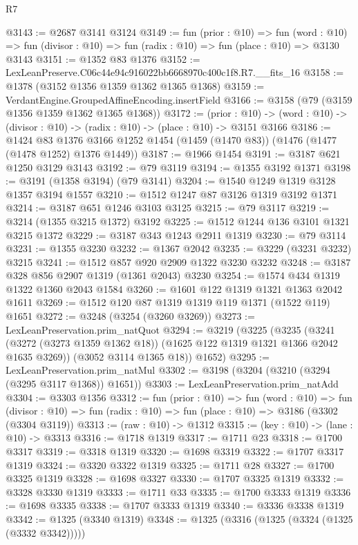 \begin{lexlean}{R7}
\begin{coremodule}
@3143 := @2687 @3141 @3124
@3149 := fun (prior : @10) =>
  fun (word : @10) => fun (divisor : @10) => fun (radix : @10) => fun (place : @10) => @3130 @3143
@3151 := @1352 @83 @1376
@3152 := LexLeanPreserve.C06c44e94c916022bb6668970c400c1f8.R7.__fits_16
@3158 := @1378 (@3152 @1356 @1359 @1362 @1365 @1368)
@3159 := VerdantEngine.GroupedAffineEncoding.insertField
@3166 := @3158 (@79 (@3159 @1356 @1359 @1362 @1365 @1368))
@3172 := (prior : @10) ->
  (word : @10) -> (divisor : @10) -> (radix : @10) -> (place : @10) -> @3151 @3166
@3186 := @1424
    @83
    @1376
    @3166
    @1252
    @1454
    (@1459 (@1470 @83))
    (@1476 (@1477 (@1478 @1252) @1376 @1449))
@3187 := @1966 @1454
@3191 := @3187 @621 @1250 @3129 @3143
@3192 := @79 @3119
@3194 := @1355 @3192 @1371
@3198 := @3191 (@1358 @3194) (@79 @3141)
@3204 := @1540 @1249 @1319 @3128 @1357 @3194 @1557
@3210 := @1512 @1247 @87 @3126 @1319 @3192 @1371
@3214 := @3187 @651 @1246 @3103 @3125
@3215 := @79 @3117
@3219 := @3214 (@1355 @3215 @1372) @3192
@3225 := @1512 @1244 @136 @3101 @1321 @3215 @1372
@3229 := @3187 @343 @1243 @2911 @1319
@3230 := @79 @3114
@3231 := @1355 @3230
@3232 := @1367 @2042
@3235 := @3229 (@3231 @3232) @3215
@3241 := @1512 @857 @920 @2909 @1322 @3230 @3232
@3248 := @3187 @328 @856 @2907 @1319 (@1361 @2043) @3230
@3254 := @1574 @434 @1319 @1322 @1360 @2043 @1584
@3260 := @1601 @122 @1319 @1321 @1363 @2042 @1611
@3269 := @1512 @120 @87 @1319 @1319 @119 @1371 (@1522 @119) @1651
@3272 := @3248 (@3254 (@3260 @3269))
@3273 := LexLeanPreservation.prim_natQuot
@3294 := @3219
    (@3225
      (@3235
        (@3241 (@3272 (@3273 @1359 @1362 @18)) (@1625 @122 @1319 @1321 @1366 @2042 @1635 @3269))
        (@3052 @3114 @1365 @18))
      @1652)
@3295 := LexLeanPreservation.prim_natMul
@3302 := @3198 (@3204 (@3210 (@3294 (@3295 @3117 @1368)) @1651))
@3303 := LexLeanPreservation.prim_natAdd
@3304 := @3303 @1356
@3312 := fun (prior : @10) =>
  fun (word : @10) =>
  fun (divisor : @10) => fun (radix : @10) => fun (place : @10) => @3186 (@3302 (@3304 @3119))
@3313 := (raw : @10) -> @1312
@3315 := (key : @10) -> (lane : @10) -> @3313
@3316 := @1718 @1319
@3317 := @1711 @23
@3318 := @1700 @3317
@3319 := @3318 @1319
@3320 := @1698 @3319
@3322 := @1707 @3317 @1319
@3324 := @3320 @3322 @1319
@3325 := @1711 @28
@3327 := @1700 @3325 @1319
@3328 := @1698 @3327
@3330 := @1707 @3325 @1319
@3332 := @3328 @3330 @1319
@3333 := @1711 @33
@3335 := @1700 @3333 @1319
@3336 := @1698 @3335
@3338 := @1707 @3333 @1319
@3340 := @3336 @3338 @1319
@3342 := @1325 (@3340 @1319)
@3348 := @1325 (@3316 (@1325 (@3324 (@1325 (@3332 @3342)))))

\end{coremodule}
\end{lexlean}
